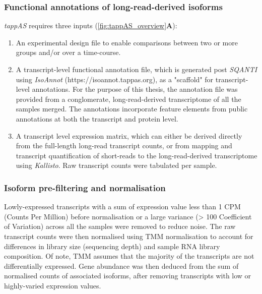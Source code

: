 \clearpage
\subsubsection{Functional annotations of long-read-derived isoforms}
\textit{tappAS} requires three inputs (\cref{fig:tappAS_overview}\textbf{A}):
\begin{enumerate}
	\item An experimental design file to enable comparisons between two or more groups and/or over a time-course. 
	\item A transcript-level functional annotation file, which is generated post \textit{SQANTI} using \textit{IsoAnnot} (https://isoannot.tappas.org), as a "scaffold" for transcript-level annotations. For the purpose of this thesis, the annotation file was provided from a conglomerate, long-read-derived transcriptome of all the samples merged. The annotations incorporate feature elements from public annotations at both the transcript and protein level. 
	\item A transcript level expression matrix, which can either be derived directly from the full-length long-read transcript counts, or from mapping and transcript quantification of short-reads to the long-read-derived transcriptome using \textit{Kallisto}\cite{Bray2016}. Raw transcript counts were tabulated per sample.  	 
\end{enumerate}


\subsubsection{Isoform pre-filtering and normalisation}
Lowly-expressed transcripts with a sum of expression value less than 1 CPM (Counts Per Million) before normalisation or a large variance (> 100 Coefficient of Variation) across all the samples were removed to reduce noise. The raw transcript counts were then normalised using TMM normalisation \cite{Robinson2010} to account for differences in library size (sequencing depth) and sample RNA library composition. Of note, TMM assumes that the majority of the transcripts are not differentially expressed. Gene abundance was then deduced from the sum of normalised counts of associated isoforms, after removing transcripts with low or highly-varied expression values. 
 

